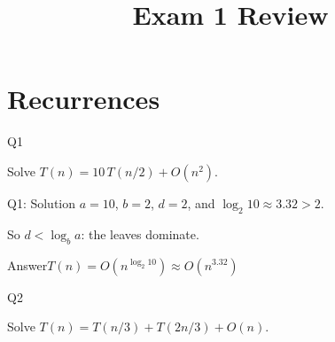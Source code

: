 \documentclass[10pt,aspectratio=169]{beamer}
\title{Exam 1 Review}
\subtitle{}
\date{}
\author{}
\newcommand{\answer}[1]{\begin{alertblock}{Answer}#1\end{alertblock}}
\begin{document}
\maketitle

\section{Recurrences}

\begin{frame}{Q1}
  \begin{center}
    \Large
    Solve \quad $T(n) = 10\,T(n/2) + O(n^2)$.
  \end{center}
\end{frame}

\begin{frame}{Q1: Solution}
  $a = 10$, \; $b = 2$, \; $d = 2$, \quad and $\log_2 10 \approx 3.32 > 2$.

  \bigskip
  So $d < \log_b a$: the leaves dominate.

  \answer{$T(n) = O\!\left(n^{\log_2 10}\right) \approx O(n^{3.32})$}
\end{frame}

\begin{frame}{Q2}
  \begin{center}
    \Large
    Solve \quad $T(n) = T(n/3) + T(2n/3) + O(n)$.
  \end{center}
\end{frame}
\end{document}
